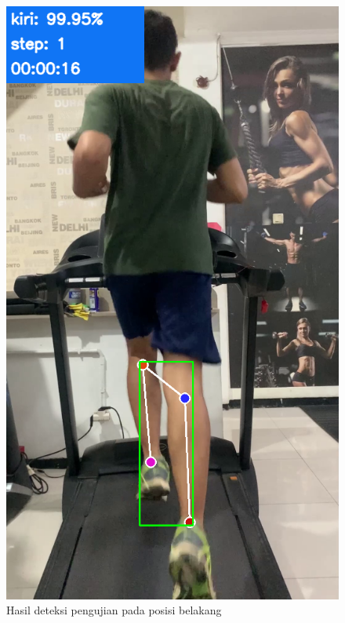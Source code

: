 \begin{figure}[H]
  \centering
  \includegraphics[scale=0.45]{gambar/posisi_belakang2.png}
  \caption{Hasil deteksi pengujian pada posisi belakang}
  \label{fig:PengujianPosisiBelakang2}
\end{figure}

